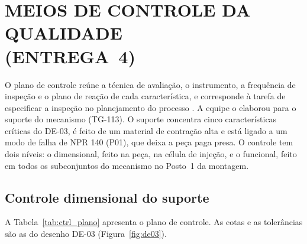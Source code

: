 \section[MEIOS DE CONTROLE DA QUALIDADE (ENTREGA 4)]{MEIOS DE CONTROLE DA QUALIDADE\\(ENTREGA~4)}\label{sec:controle_qualidade}

O plano de controle reúne a técnica de avaliação, o instrumento, a frequência de inspeção e o plano de reação de cada característica, e corresponde à tarefa de especificar a inspeção no planejamento do processo \cite{rozenfeld2006gestao}. A equipe o elaborou para o suporte do mecanismo (TG-113). O suporte concentra cinco características críticas do DE-03, é feito de um material de contração alta e está ligado a um modo de falha de NPR 140 (P01), que deixa a peça paga presa. O controle tem dois níveis: o dimensional, feito na peça, na célula de injeção, e o funcional, feito em todos os subconjuntos do mecanismo no Posto~1 da montagem.

\subsection{Controle dimensional do suporte}
\label{subsec:ctrl_dimensional}

A Tabela~\ref{tab:ctrl_plano} apresenta o plano de controle. As cotas e as tolerâncias são as do desenho DE-03 (Figura~\ref{fig:de03}).

